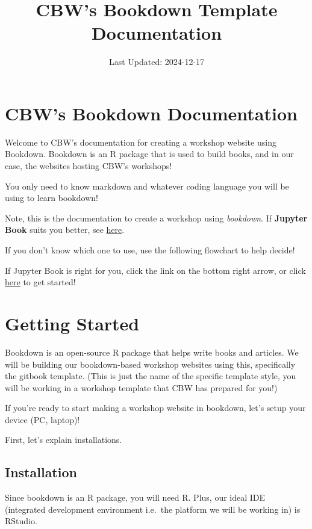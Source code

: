 \documentclass[
]{book}
\title{CBW's Bookdown Template Documentation}
\author{}
\date{\vspace{-2.5em}Last Updated: 2024-12-17}
\theoremstyle{definition}
\theoremstyle{definition}
\theoremstyle{definition}
\theoremstyle{definition}
\theoremstyle{remark}
\begin{document}
\maketitle

{
\setcounter{tocdepth}{1}
\tableofcontents
}
\chapter{CBW's Bookdown Documentation}\label{cbws-bookdown-documentation}

Welcome to CBW's documentation for creating a workshop website using Bookdown. Bookdown is an R package that is used to build books, and in our case, the websites hosting CBW's workshops!

You only need to know markdown and whatever coding language you will be using to learn bookdown!

Note, this is the documentation to create a workshop using \emph{bookdown}. If \textbf{Jupyter Book} suits you better, see \href{https://cbw-dev.github.io/jupyterbook-docs/}{here}.

If you don't know which one to use, use the following flowchart to help decide!

If Jupyter Book is right for you, click the link on the bottom right arrow, or click \hyperref[get-started]{here} to get started!

\chapter{Getting Started}\label{get-started}

Bookdown is an open-source R package that helps write books and articles. We will be building our bookdown-based workshop websites using this, specifically the gitbook template. (This is just the name of the specific template style, you will be working in a workshop template that CBW has prepared for you!)

If you're ready to start making a workshop website in bookdown, let's setup your device (PC, laptop)!

First, let's explain installations.

\section{Installation}\label{installation}

Since bookdown is an R package, you will need R. Plus, our ideal IDE (integrated development environment i.e.~the platform we will be working in) is RStudio.
\end{document}
